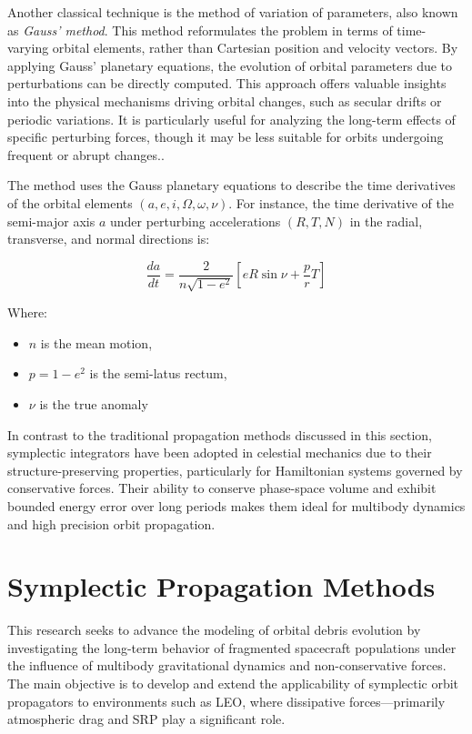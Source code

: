 \documentclass[letterpaper, preprint, paper,11pt]{AAS}	%
\begin{document}
Another classical technique is the method of variation of parameters, also known as \textit{Gauss’ method}. This method reformulates the problem in terms of time-varying orbital elements, rather than Cartesian position and velocity vectors. By applying Gauss’ planetary equations, the evolution of orbital parameters due to perturbations can be directly computed. This approach offers valuable insights into the physical mechanisms driving orbital changes, such as secular drifts or periodic variations. It is particularly useful for analyzing the long-term effects of specific perturbing forces, though it may be less suitable for orbits undergoing frequent or abrupt changes.\cite{montenbruck_satellite_2000}. 

The method uses the Gauss planetary equations to describe the time derivatives of the orbital elements $(a,e,i,\Omega,\omega,\nu)$. For instance, the time derivative of the semi-major axis $a$ under perturbing accelerations $(R,T,N)$ in the radial, transverse, and normal directions is:

\begin{equation}
\frac{da}{dt} = \frac{2}{n \sqrt{1 - e^2}} \left[ e R \sin \nu + \frac{p}{r} T \right]
\end{equation}

Where:

\begin{itemize}
    \item $n$ is the mean motion,
    \item $p=1-e^2$ is the semi-latus rectum,
    \item $\nu$ is the true anomaly
\end{itemize}

In contrast to the traditional propagation methods discussed in this section, symplectic integrators have been adopted in celestial mechanics due to their structure-preserving properties, particularly for Hamiltonian systems governed by conservative forces. Their ability to conserve phase-space volume and exhibit bounded energy error over long periods makes them ideal for multibody dynamics and high precision orbit propagation\cite{hubaux_symplectic_2012}.


\section{Symplectic Propagation Methods}
This research seeks to advance the modeling of orbital debris evolution by investigating the long-term behavior of fragmented spacecraft populations under the influence of multibody gravitational dynamics and non-conservative forces. The main objective is to develop and extend the applicability of symplectic orbit propagators to environments such as LEO, where dissipative forces—primarily atmospheric drag and SRP play a significant role.
\end{document}
